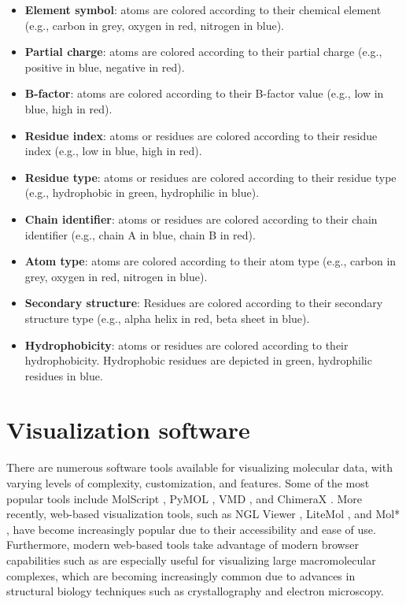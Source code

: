 \documentclass[
  digital,     %
  oneside,     %
  nosansbold,  %
  nocolorbold, %
  lof,         %
  lot,         %
]{fithesis4}
\begin{document}
\begin{itemize}
  \item \textbf{Element symbol}: atoms are colored according to their chemical element (e.g., carbon in grey, oxygen in red, nitrogen in blue).
  \item \textbf{Partial charge}: atoms are colored according to their partial charge (e.g., positive in blue, negative in red).
  \item \textbf{B-factor}: atoms are colored according to their B-factor value (e.g., low in blue, high in red).
  \item \textbf{Residue index}: atoms or residues are colored according to their residue index (e.g., low in blue, high in red).
  \item \textbf{Residue type}: atoms or residues are colored according to their residue type (e.g., hydrophobic in green, hydrophilic in blue).
  \item \textbf{Chain identifier}: atoms or residues are colored according to their chain identifier (e.g., chain A in blue, chain B in red).
  \item \textbf{Atom type}: atoms are colored according to their atom type (e.g., carbon in grey, oxygen in red, nitrogen in blue).
  \item \textbf{Secondary structure}: Residues are colored according to their secondary structure type (e.g., alpha helix in red, beta sheet in blue).
  \item \textbf{Hydrophobicity}: atoms or residues are colored according to their hydrophobicity. Hydrophobic residues are depicted in green, hydrophilic residues in blue.
\end{itemize}


\section{Visualization software}
\label{section:visualization_software}


There are numerous software tools available for visualizing molecular data, with varying levels of complexity, customization, and features. Some of the most popular tools include MolScript \cite{kraulis1991molscript}, PyMOL \cite{delano2002pymol}, VMD \cite{humphrey1996vmd}, and ChimeraX \cite{goddard2018ucsf}. More recently, web-based visualization tools, such as NGL Viewer \cite{rose2015ngl}, LiteMol \cite{sehnal2017litemol}, and Mol* \cite{sehnal2021molstar}, have become increasingly popular due to their accessibility and ease of use. Furthermore, modern web-based tools take advantage of modern browser capabilities such as  are especially useful for visualizing large macromolecular complexes, which are becoming increasingly common due to advances in structural biology techniques such as crystallography and electron microscopy. \cite{sehnal2021molstar}
\end{document}
